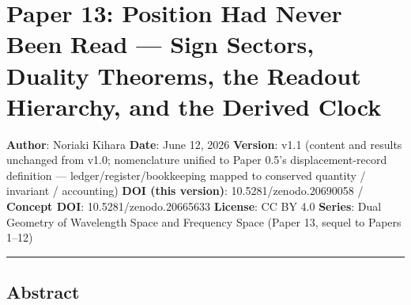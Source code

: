 \documentclass[
]{ltjsarticle}
\author{}
\date{}
\begin{document}
\section{Paper 13: Position Had Never Been Read --- Sign Sectors,
Duality Theorems, the Readout Hierarchy, and the Derived
Clock}\label{paper-13-position-had-never-been-read-sign-sectors-duality-theorems-the-readout-hierarchy-and-the-derived-clock}

\textbf{Author}: Noriaki Kihara \textbf{Date}: June 12, 2026
\textbf{Version}: v1.1 (content and results unchanged from v1.0;
nomenclature unified to Paper 0.5's displacement-record definition ---
ledger/register/bookkeeping mapped to conserved quantity / invariant /
accounting) \textbf{DOI (this version)}: 10.5281/zenodo.20690058 /
\textbf{Concept DOI}: 10.5281/zenodo.20665633 \textbf{License}: CC BY
4.0 \textbf{Series}: Dual Geometry of Wavelength Space and Frequency
Space (Paper 13, sequel to Papers 1--12)

\begin{center}\rule{0.5\linewidth}{0.5pt}\end{center}

\subsection{Abstract}\label{abstract}
\end{document}
